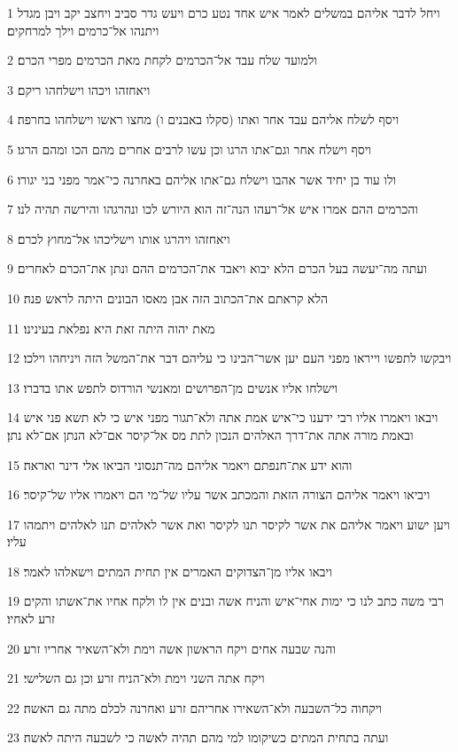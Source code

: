 \par 1 ויחל לדבר אליהם במשלים לאמר איש אחד נטע כרם ויעש גדר סביב ויחצב יקב ויבן מגדל ויתנהו אל־כרמים וילך למרחקים׃
\par 2 ולמועד שלח עבד אל־הכרמים לקחת מאת הכרמים מפרי הכרם׃
\par 3 ויאחזהו ויכהו וישלחהו ריקם׃
\par 4 ויסף לשלח אליהם עבד אחר ואתו (סקלו באבנים ו) מחצו ראשו וישלחהו בחרפה׃
\par 5 ויסף וישלח אחר וגם־אתו הרגו וכן עשו לרבים אחרים מהם הכו ומהם הרגו׃
\par 6 ולו עוד בן יחיד אשר אהבו וישלח גם־אתו אליהם באחרנה כי־אמר מפני בני יגורו׃
\par 7 והכרמים ההם אמרו איש אל־רעהו הנה־זה הוא היורש לכו ונהרגהו והירשה תהיה לנו׃
\par 8 ויאחזהו ויהרגו אותו וישליכהו אל־מחוץ לכרם׃
\par 9 ועתה מה־יעשה בעל הכרם הלא יבוא ויאבד את־הכרמים ההם ונתן את־הכרם לאחרים׃
\par 10 הלא קראתם את־הכתוב הזה אבן מאסו הבונים היתה לראש פנה׃
\par 11 מאת יהוה היתה זאת היא נפלאת בעינינו׃
\par 12 ויבקשו לתפשו וייראו מפני העם יען אשר־הבינו כי עליהם דבר את־המשל הזה ויניחהו וילכו׃
\par 13 וישלחו אליו אנשים מן־הפרושים ומאנשי הורדוס לתפש אתו בדברו׃
\par 14 ויבאו ויאמרו אליו רבי ידענו כי־איש אמת אתה ולא־תגור מפני איש כי לא תשא פני איש ובאמת מורה אתה את־דרך האלהים הנכון לתת מס אל־קיסר אם־לא הנתן אם־לא נתן׃
\par 15 והוא ידע את־חנפתם ויאמר אליהם מה־תנסוני הביאו אלי דינר ואראה׃
\par 16 ויביאו ויאמר אליהם הצורה הזאת והמכתב אשר עליו של־מי הם ויאמרו אליו של־קיסר׃
\par 17 ויען ישוע ויאמר אליהם את אשר לקיסר תנו לקיסר ואת אשר לאלהים תנו לאלהים ויתמהו עליו׃
\par 18 ויבאו אליו מן־הצדוקים האמרים אין תחית המתים וישאלהו לאמר׃
\par 19 רבי משה כתב לנו כי ימות אחי־איש והניח אשה ובנים אין לו ולקח אחיו את־אשתו והקים זרע לאחיו׃
\par 20 והנה שבעה אחים ויקח הראשון אשה וימת ולא־השאיר אחריו זרע׃
\par 21 ויקח אתה השני וימת ולא־הניח זרע וכן גם השלישי׃
\par 22 ויקחוה כל־השבעה ולא־השאירו אחריהם זרע ואחרנה לכלם מתה גם האשה׃
\par 23 ועתה בתחית המתים כשיקומו למי מהם תהיה לאשה כי לשבעה היתה לאשה׃
